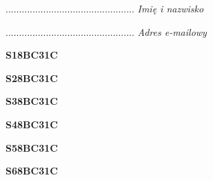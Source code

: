 \begin{turn}{90}\begin{minipage}{\linewidth} \vspace{20mm} ................................................  \textit{Imię i nazwisko}\end{minipage}\end{turn}

\begin{turn}{90}\begin{minipage}{\linewidth} \vspace{20mm} ................................................  \textit{Adres e-mailowy}\end{minipage}\end{turn}

\begin{turn}{90}\huge \begin{minipage}{\linewidth} \vspace{10mm}\textbf{S18BC31C}\end{minipage}\end{turn}

\begin{turn}{90}\huge \begin{minipage}{\linewidth} \vspace{10mm}\textbf{S28BC31C}\end{minipage}\end{turn}

\begin{turn}{90}\huge \begin{minipage}{\linewidth} \vspace{10mm}\textbf{S38BC31C}\end{minipage}\end{turn}

\begin{turn}{90}\huge \begin{minipage}{\linewidth} \vspace{10mm}\textbf{S48BC31C}\end{minipage}\end{turn}

\begin{turn}{90}\huge \begin{minipage}{\linewidth} \vspace{10mm}\textbf{S58BC31C}\end{minipage}\end{turn}

\begin{turn}{90}\huge \begin{minipage}{\linewidth} \vspace{10mm}\textbf{S68BC31C}\end{minipage}\end{turn}

